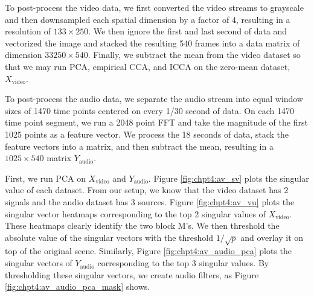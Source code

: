 To post-process the video data, we first converted the video streams to grayscale and then
downsampled each spatial dimension by a factor of 4, resulting in a resolution of
$133\times 250$. We then ignore the first and last second of data and vectorized the image
and stacked the resulting 540 frames into a data matrix of dimension $33250 \times
540$. Finally, we subtract the mean from the video dataset so that we may run PCA, empirical CCA,
and ICCA on the zero-mean dataset, $X_{\text{video}}$.

To post-process the audio data, we separate the audio stream into equal window sizes of
1470 time points centered on every 1/30 second of data. On each 1470 time point segment,
we run a 2048 point FFT and take the magnitude of the first 1025 points as a feature
vector. We process the 18 seconds of data, stack the feature vectors into a matrix, and
then subtract the mean, resulting in a $1025 \times 540$ matrix $Y_{\text{audio}}$.

First, we run PCA on $X_{\text{video}}$ and $Y_{\text{audio}}$. Figure \ref{fig:chpt4:av_sv}
plots the singular value of each dataset. From our setup, we know that the video dataset
has 2 signals and the audio dataset has 3 sources. Figure \ref{fig:chpt4:av_vu} plots
the singular vector heatmaps corresponding to the top 2 singular values of
$X_{\text{video}}$. These heatmaps clearly identify the two block M's. We then
threshold the absolute value of the singular vectors with the threshold $1/\sqrt{p}$
and overlay it on top of the original scene. Similarly, Figure \ref{fig:chpt4:av_audio_pca}
plots the singular vectors of $Y_{\text{audio}}$ corresponding to the top 3 singular
values. By thresholding these singular vectors, we create audio filters, as Figure
\ref{fig:chpt4:av_audio_pca_mask} shows. 


